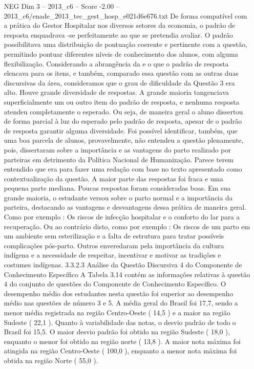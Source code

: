\begin{textsample}{NEG Dim 3 – 2013\_c6 – Score -2.00 – 2013\_c6/enade\_2013\_tec\_gest\_hosp\_e021d6e676.txt}
De forma compatível com a prática do Gestor Hospitalar nos diversos setores da economia, o padrão de resposta enquadrava -se perfeitamente ao que se pretendia avaliar.
O padrão possibilitava uma distribuição de pontuação coerente e pertinente com a questão, permitindo pontuar diferentes níveis de conhecimento dos alunos, com alguma flexibilização.
Considerando a abrangência da e o que o padrão de resposta elencava para os itens, e também, comparado essa questão com as outras duas discursivas da área, consideramos que o grau de dificuldade da Questão 3 era alto.
Houve grande diversidade de respostas.
A grande maioria tangenciava superficialmente um ou outro item do padrão de resposta, e nenhuma resposta atendeu completamente o esperado.
Ou seja, de maneira geral o aluno dissertou de forma parcial à luz do esperado pelo padrão de resposta, apesar de o padrão de resposta garantir alguma diversidade.
Foi possível identificar, também, que uma boa parcela de alunos, provavelmente, não entendeu a questão plenamente, pois, dissertaram sobre a importância e as vantagens do parto realizado por parteiras em detrimento da Política Nacional de Humanização.
Parece terem entendido que era para fazer uma redação com base no texto apresentado como contextualização da questão.
A maior parte das respostas foi fraca e uma pequena parte mediana.
Poucas respostas foram consideradas boas.
Em sua grande maioria, o estudante versou sobre o parto normal e a importância da parteira, destacando as vantagens e desvantagens dessa prática de maneira geral.
Como por exemplo : Os riscos de infecção hospitalar e o conforto do lar para a recuperação.
Ou ao contrário disto, como por exemplo : Os riscos de um parto em um ambiente sem esterilização e a falta de estrutura para tratar possíveis complicações pós-parto.
Outros enveredaram pela importância da cultura indígena e a necessidade de respeitar, incentivar e motivar as tradições e costumes indígenas. 3.3.2.3 Análise da Questão Discursiva 4 do Componente de Conhecimento Específico A Tabela 3.14 contém as informações relativas à questão 4 do conjunto de questões do Componente de Conhecimento Específico.
O desempenho médio dos estudantes nesta questão foi superior ao desempenho médio nas questões de número 3 e 5.
A média geral do Brasil foi 17,7, sendo a menor média registrada na região Centro-Oeste ( 14,5 ) e a maior na região Sudeste ( 22,1 ).
Quanto à variabilidade das notas, o desvio padrão de todo o Brasil foi 15,5.
O maior desvio padrão foi obtido na região Sudeste ( 18,0 ), enquanto o menor foi obtido na região norte ( 13,8 ).
A maior nota máxima foi atingida na região Centro-Oeste ( 100,0 ), enquanto a menor nota máxima foi obtida na região Norte ( 55,0 ).

\end{textsample}

